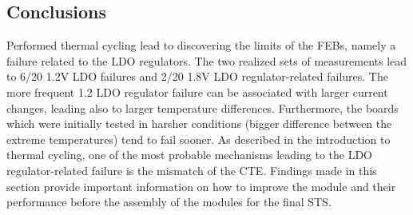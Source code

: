 \subsection{Conclusions}
Performed thermal cycling lead to discovering the limits of the \glspl{FEB}, namely a failure related to the \gls{LDO} regulators. The two realized sets of measurements lead to 6/20 1.2V \gls{LDO} failures and 2/20 1.8V \gls{LDO} regulator-related failures. The more frequent 1.2 \gls{LDO} regulator failure can be associated with larger current changes, leading also to larger temperature differences. Furthermore, the boards which were initially tested in harsher conditions (bigger difference between the extreme temperatures) tend to fail sooner. As described in the introduction to thermal cycling, one of the most probable mechanisms leading to the \gls{LDO} regulator-related failure is the mismatch of the \gls{CTE}. Findings made in this section provide important information on how to improve the module and their performance before the assembly of the modules for the final \gls{STS}. 



\newpage